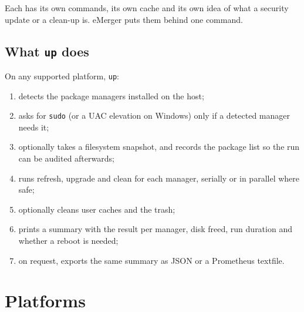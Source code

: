 \documentclass[11pt,a4paper]{article}
\begin{document}
Each has its own commands, its own cache and its own idea of what a
security update or a clean-up is. eMerger puts them behind one command.

\subsection{What \texttt{up} does}
On any supported platform, \texttt{up}:

\begin{enumerate}
  \item detects the package managers installed on the host;
  \item asks for \texttt{sudo} (or a UAC elevation on Windows) only if a
        detected manager needs it;
  \item optionally takes a filesystem snapshot, and records the package
        list so the run can be audited afterwards;
  \item runs refresh, upgrade and clean for each manager, serially or in
        parallel where safe;
  \item optionally cleans user caches and the trash;
  \item prints a summary with the result per manager, disk freed, run
        duration and whether a reboot is needed;
  \item on request, exports the same summary as JSON or a Prometheus
        textfile.
\end{enumerate}

\section{Platforms}\label{sec:platforms}
\end{document}

